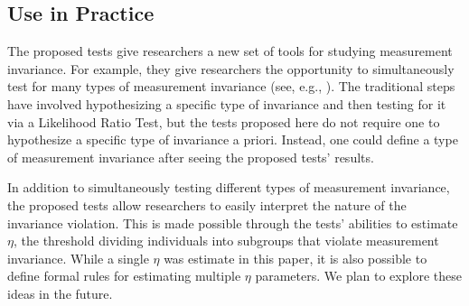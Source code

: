 \documentclass[man]{apa}
\begin{document}
\subsection{Use in Practice}
The proposed tests give researchers a new set of tools for studying 
measurement invariance.  For example, they give researchers the
opportunity to simultaneously test for many types of measurement
invariance (see, e.g., ).  The traditional
steps have involved hypothesizing a specific type of invariance and
then testing for it via a Likelihood Ratio Test, but the tests
proposed here do not require one to hypothesize a specific type of
invariance a priori.  Instead, one could define a type of measurement
invariance after seeing the proposed tests' results.

In addition to simultaneously testing different types of measurement
invariance, the proposed tests allow researchers to easily interpret
the nature of the invariance violation.  This is made possible through
the tests' abilities to estimate $\eta$, the threshold dividing
individuals into subgroups that violate
measurement invariance.  While a single $\eta$ was estimate in this
paper, it is also possible to define 
formal rules for estimating multiple $\eta$ parameters.  We plan to
explore these ideas in the future.


\end{document}
